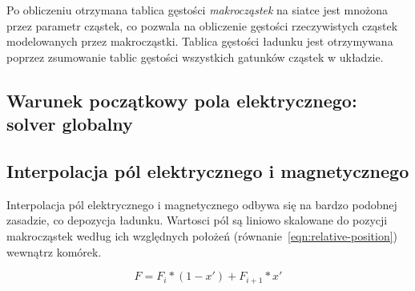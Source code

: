 
Po obliczeniu otrzymana tablica gęstości \emph{makrocząstek} na
siatce jest mnożona przez parametr  cząstek, co pozwala na
obliczenie gęstości rzeczywistych cząstek modelowanych przez makrocząstki.
Tablica gęstości ładunku jest otrzymywana poprzez zsumowanie tablic gęstości
wszystkich gatunków cząstek w układzie.


%
%
%

\subsection{Warunek początkowy pola elektrycznego: solver globalny} %


\subsection{Interpolacja pól elektrycznego i magnetycznego}

Interpolacja pól elektrycznego i magnetycznego odbywa się na bardzo podobnej
zasadzie, co depozycja ładunku. Wartosci pól są liniowo skalowane do pozycji
makrocząstek według ich względnych położeń (równanie~\ref{eqn:relative-position}) wewnątrz komórek.

\begin{equation}
    F = F_i * (1-x') + F_{i+1} * x'
    \label{eqn:field-interpolation}
\end{equation}

